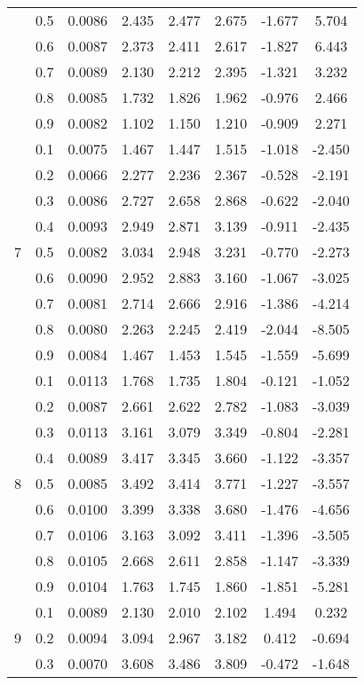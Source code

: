 \documentclass[11pt,a4paper]{report}
\begin{document}
\begin{longtable}{ | c | c || c | c | c | c | c | c | }
 & 0.5 & 0.0086 & 2.435 & 2.477 & 2.675 & -1.677 & 5.704 \\
 & 0.6 & 0.0087 & 2.373 & 2.411 & 2.617 & -1.827 & 6.443 \\
 & 0.7 & 0.0089 & 2.130 & 2.212 & 2.395 & -1.321 & 3.232 \\
 & 0.8 & 0.0085 & 1.732 & 1.826 & 1.962 & -0.976 & 2.466 \\
 & 0.9 & 0.0082 & 1.102 & 1.150 & 1.210 & -0.909 & 2.271 \\
 \hline
\multirow{9}{*}{7} & 0.1 & 0.0075 & 1.467 & 1.447 & 1.515 & -1.018 & -2.450 \\
 & 0.2 & 0.0066 & 2.277 & 2.236 & 2.367 & -0.528 & -2.191 \\
 & 0.3 & 0.0086 & 2.727 & 2.658 & 2.868 & -0.622 & -2.040 \\
 & 0.4 & 0.0093 & 2.949 & 2.871 & 3.139 & -0.911 & -2.435 \\
 & 0.5 & 0.0082 & 3.034 & 2.948 & 3.231 & -0.770 & -2.273 \\
 & 0.6 & 0.0090 & 2.952 & 2.883 & 3.160 & -1.067 & -3.025 \\
 & 0.7 & 0.0081 & 2.714 & 2.666 & 2.916 & -1.386 & -4.214 \\
 & 0.8 & 0.0080 & 2.263 & 2.245 & 2.419 & -2.044 & -8.505 \\
 & 0.9 & 0.0084 & 1.467 & 1.453 & 1.545 & -1.559 & -5.699 \\
 \hline
\multirow{9}{*}{8} & 0.1 & 0.0113 & 1.768 & 1.735 & 1.804 & -0.121 & -1.052 \\
 & 0.2 & 0.0087 & 2.661 & 2.622 & 2.782 & -1.083 & -3.039 \\
 & 0.3 & 0.0113 & 3.161 & 3.079 & 3.349 & -0.804 & -2.281 \\
 & 0.4 & 0.0089 & 3.417 & 3.345 & 3.660 & -1.122 & -3.357 \\
 & 0.5 & 0.0085 & 3.492 & 3.414 & 3.771 & -1.227 & -3.557 \\
 & 0.6 & 0.0100 & 3.399 & 3.338 & 3.680 & -1.476 & -4.656 \\
 & 0.7 & 0.0106 & 3.163 & 3.092 & 3.411 & -1.396 & -3.505 \\
 & 0.8 & 0.0105 & 2.668 & 2.611 & 2.858 & -1.147 & -3.339 \\
 & 0.9 & 0.0104 & 1.763 & 1.745 & 1.860 & -1.851 & -5.281 \\
 \hline
\multirow{9}{*}{9} & 0.1 & 0.0089 & 2.130 & 2.010 & 2.102 & 1.494 & 0.232 \\
 & 0.2 & 0.0094 & 3.094 & 2.967 & 3.182 & 0.412 & -0.694 \\
 & 0.3 & 0.0070 & 3.608 & 3.486 & 3.809 & -0.472 & -1.648 \\

\end{longtable}
\end{document}
